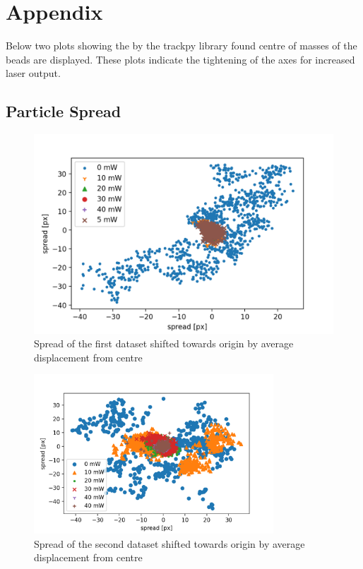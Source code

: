 \section{Appendix}
Below two plots showing the by the trackpy library found centre of masses of the beads are displayed. These plots indicate the tightening of the axes for increased laser output.
\subsection{Particle Spread}
\begin{figure}[!ht]
    \centering
    \includegraphics[width=.8\textwidth,keepaspectratio]{figures/spread-dataset1.png}
    \caption{Spread of the first dataset shifted towards origin by average displacement from centre}
\end{figure}
\begin{figure}[!ht]
    \centering
    \includegraphics[width=0.8\textwidth,keepaspectratio]{figures/spread-dataset2.png}
    \caption{Spread of the second dataset shifted towards origin by average displacement from centre}
\end{figure}
\clearpage
